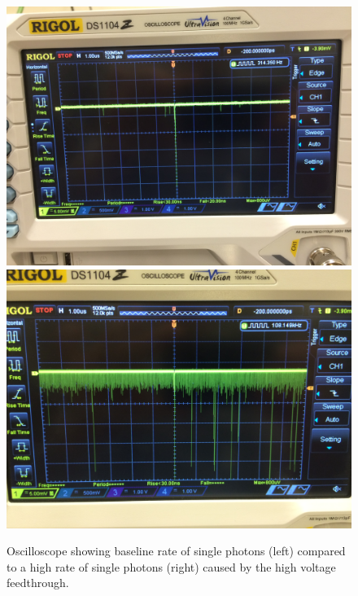\begin{figure}[htbp]
\begin{center}
\includegraphics[width=\halffig]{figures/testbed/baseline.jpg}
\includegraphics[width=\halffig]{figures/testbed/phog.jpg}
\caption{Oscilloscope showing baseline rate of single photons (left) compared to a high rate of single photons (right) caused by the high voltage feedthrough.}
\label{fig:phog}
\end{center}
\end{figure}


